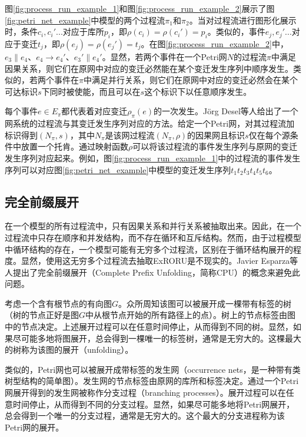 图\ref{fig:process_run_example_1}和图\ref{fig:process_run_example_2}展示了图\ref{fig:petri_net_example}中模型的两个过程流$\pi_{1}$和$\pi_{2}$。当对过程流进行图形化展示时，条件$c_{i},c_{i}'...$对应于库所$p_{i}$，即$\rho(c_{i})=\rho(c_{i}')=p_{i}$。类似的，事件$e_{j},e_{j}'...$对应于变迁$t_{j}$，即$\rho(e_{j})=\rho(e_{j}')=t_{j}$。在图\ref{fig:process_run_example_2}中，$e_{3}\parallel e_{4}$、$e_{4}\rightarrow e_{4}'$、$e_{3}'\parallel e_{4}'$。显然，若两个事件在一个Petri网$N$的过程流$\pi$中满足因果关系，则它们在原网中对应的变迁必然能在某个变迁发生序列中顺序发生。类似的，若两个事件在$\pi$中满足并行关系，则它们在原网中对应的变迁必然会在某个可达标识$s$下同时被使能，而且可以在$s$这个标识下以任意顺序发生。

每个事件$e\in E_{\pi}$都代表着对应变迁$\rho_{\pi}(e)$的一次发生。J{\"o}rg Desel等人给出了一个网系统的过程流与其变迁发生序列对应的方法\cite{desel2000validation}。给定一个Petri网，对其过程流加标识得到$(N_{\pi},s)$，其中$N_{\pi}$是该网过程流$(N_{\pi},\rho)$的因果网且标识$s$仅在每个源条件中放置一个托肯。通过映射函数$\rho$可以将该过程流的事件发生序列与原网的变迁发生序列对应起来。例如，图\ref{fig:process_run_example_1}中的过程流的事件发生序列可以对应图\ref{fig:petri_net_example}中模型的变迁发生序列$t_{1}t_{2}t_{3}t_{4}t_{5}t_{6}$。

\subsection{完全前缀展开}\label{subsec:cpu}
在一个模型的所有过程流中，只有因果关系和并行关系被抽取出来。因此，在一个过程流中只存在顺序和并发结构，而不存在循环和互斥结构。然而，由于过程模型中循环结构的存在，一个模型可能有无穷多个过程流，区别在于循环结构展开的程度。显然，使用这无穷多个过程流去抽取ExRORU是不现实的。Javier Esparza等人提出了完全前缀展开（Complete Prefix Unfolding，简称CPU）的概念来避免此问题\cite{esparza2002improvement}。

考虑一个含有根节点的有向图$G$。众所周知该图可以被展开成一棵带有标签的树（树的节点正好是图$G$中从根节点开始的所有路径上的点）。树上的节点标签由图中的节点决定。上述展开过程可以在任意时间停止，从而得到不同的树。显然，如果尽可能多地将图展开，总会得到一棵唯一的标签树，通常是无穷大的。这棵最大的树称为该图的展开（unfolding）。

类似的，Petri网也可以被展开成带标签的发生网（occurrence nets，是一种带有类树型结构的简单图）。发生网的节点标签由原网的库所和标签决定。通过一个Petri网展开得到的发生网被称作分支过程（branching processes）。展开过程可以在任意时间停止，从而得到不同的分支过程。显然，如果尽可能多地将Petri网展开，总会得到一个唯一的分支过程，通常是无穷大的。这个最大的分支进程称为该Petri网的展开。

